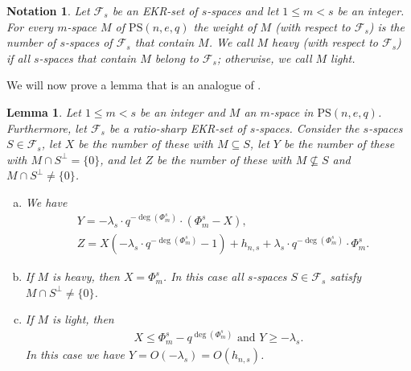 \documentclass[11pt]{article}
\newtheorem{lemma}[thm]{Lemma}
\newtheorem{notation}[thm]{Notation}
\newcommand{\EKR}{\mathcal{F}}
\newcommand{\PS}{\mathrm{PS}}
\renewcommand{\le}{\leqslant}
\renewcommand{\leq}{\leqslant}
\renewcommand{\ge}{\geqslant}
\begin{document}
\begin{notation}
	Let $\EKR_s$ be an EKR-set of $s$-spaces and let $1\leq m <s$ be an integer. For every $m$-space $M$ of $\PS(n,e,q)$ the \emph{weight} of $M$ (with respect to $\EKR_s$) is the number of $s$-spaces of $\EKR_s$ that contain $M$. We call $M$ \emph{heavy} (with respect to $\EKR_s$) if all $s$-spaces that contain $M$ belong to $\EKR_s$; otherwise, we call $M$ \emph{light}.
\end{notation}

We will now prove a lemma that is an analogue of .


\begin{lemma} \label{L:XYZform<s}
Let $1\leq m<s$ be an integer and $M$ an $m$-space in $\PS(n,e,q)$. Furthermore, let $\EKR_s$ be a ratio-sharp EKR-set of $s$-spaces. Consider the $s$-spaces $S \in \EKR_s$, let $X$ be the number of these with $M \subseteq S$, let $Y$ be the number of these with $M\cap  S^\perp=\{0\}$, and let $Z$ be the number of these with $M\not\subseteq S$ and $M\cap  S^\perp\neq \{0\}$.
\begin{enumerate}[(a)]
\item We have 
\begin{align*}
    & Y= -\lambda_s \cdot q^{-\deg(\Phi_m^s)} \cdot (\Phi_m^s-X), \\
    & Z= X(-\lambda_s \cdot q^{-\deg(\Phi_m^s)}-1)+h_{n,s}+\lambda_s \cdot q^{-\deg(\Phi_m^s)} \cdot \Phi_m^s .
\end{align*}
\item If $M$ is heavy, then $X=\Phi_m^s$. In this case all $s$-spaces $S\in \EKR_s$ satisfy $M\cap S^\perp\neq \{0\}$.
\item If $M$ is light, then 
\begin{align*}
    X\le \Phi_m^s-q^{\deg(\Phi_m^s)} \text{\ and } Y\ge -\lambda_s .
\end{align*}
In this case we have $Y=O(-\lambda_s)=O(h_{n,s})$.
\end{enumerate}
\end{lemma}
\end{document}
